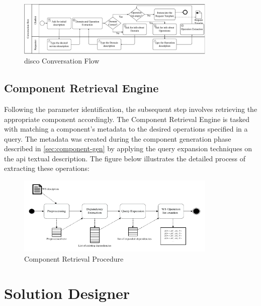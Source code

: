 \begin{figure}[hbt]
\hypertarget{fig:disco-flow}{%
\centering
\includegraphics[width=0.85\textwidth]{../figures/MyFigures/ConversationFlow.drawio.pdf}
\captionsetup{justification=centering}
\caption{\gls{disco} Conversation Flow}\label{fig:disco-flow}
}
\end{figure}

\vspace{-10pt}
\hypertarget{sec:Component-retrieval-engine}{%
\subsection{Component Retrieval Engine}\label{sec:Component-retrieval-engine}}
\vspace{10pt} 	

Following the parameter identification, the subsequent step involves retrieving the appropriate component accordingly. The Component Retrieval Engine is tasked with matching a component’s metadata to the desired operations specified in a query. The metadata was created during the component generation phase described in \cref{sec:component-gen} by applying the query expansion techniques on the \gls{api} textual description. The figure below illustrates the detailed process of extracting these operations:

\begin{figure}[hbt]
\hypertarget{fig:disco-retrieve}{%
\centering
\includegraphics[width=0.85\textwidth]{../figures/MyFigures/retrival.pdf}
\captionsetup{justification=centering}
\caption{Component Retrieval Procedure}\label{fig:disco-retrieve}
}
\end{figure}


\vspace{-10pt}
\hypertarget{sec:solution-Designer}{%
\section{Solution Designer}\label{sec:solution-Designer}}
\vspace{10pt}

